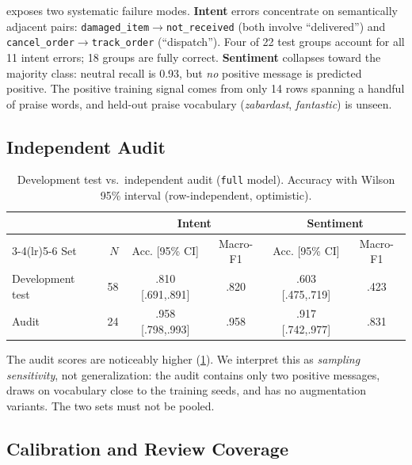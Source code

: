 \documentclass[11pt,a4paper]{article}
\theoremstyle{remark}
\newcommand{\lbl}[1]{\texttt{#1}}                      %
\newcommand{\hi}[1]{\textit{#1}}                       %
\begin{document}
 exposes two systematic failure modes. \textbf{Intent}
errors concentrate on semantically adjacent pairs:
\lbl{damaged\_item}$\to$\lbl{not\_received} (both involve ``delivered'') and
\lbl{cancel\_order}$\to$\lbl{track\_order} (``dispatch''). Four of 22 test
groups account for all 11 intent errors; 18 groups are fully correct.
\textbf{Sentiment} collapses toward the majority class: neutral recall is
0.93, but \emph{no} positive message is predicted positive. The positive
training signal comes from only 14 rows spanning a handful of praise words,
and held-out praise vocabulary (\hi{zabardast}, \hi{fantastic}) is unseen.

\subsection{Independent Audit}

\begin{table}[h]
\centering\small
\caption{Development test vs.\ independent audit (\lbl{full} model). Accuracy
with Wilson 95\% interval (row-independent, optimistic).}
\label{tab:audit}
\begin{tabular}{@{}l r cc cc@{}}
\toprule
& & \multicolumn{2}{c}{Intent} & \multicolumn{2}{c}{Sentiment}\\
\cmidrule(lr){3-4}\cmidrule(lr){5-6}
Set & $N$ & Acc. [95\% CI] & Macro-F1 & Acc. [95\% CI] & Macro-F1\\
\midrule
Development test & 58 &.810 [.691,.891] &.820 &.603 [.475,.719] &.423 \\
Audit            & 24 &.958 [.798,.993] &.958 &.917 [.742,.977] &.831 \\
\bottomrule
\end{tabular}
\end{table}

The audit scores are noticeably higher (\cref{tab:audit}). We interpret this as
\emph{sampling sensitivity}, not generalization: the audit contains only two
positive messages, draws on vocabulary close to the training seeds, and has
no augmentation variants. The two sets must not be pooled.

\subsection{Calibration and Review Coverage}
\end{document}
